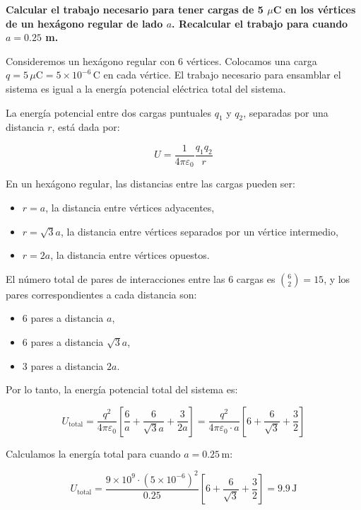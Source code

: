 \documentclass[answers]{exam} %
\begin{document}
\begin{questions}
	\vspace{0.5cm}

	\question \large\textbf{Calcular el trabajo necesario para tener cargas de 5 $\mu$C en los vértices de un hexágono regular de lado $a$. Recalcular el trabajo para cuando $a = 0.25$ m.}

	Consideremos un hexágono regular con 6 vértices. Colocamos una carga \( q = 5 \, \mu\text{C} = 5 \times 10^{-6} \, \text{C} \) en cada vértice. El trabajo necesario para ensamblar el sistema es igual a la energía potencial eléctrica total del sistema.

	La energía potencial entre dos cargas puntuales \( q_1 \) y \( q_2 \), separadas por una distancia \( r \), está dada por:

	\[
		U = \frac{1}{4 \pi \varepsilon_0} \frac{q_1 q_2}{r}
	\]

	En un hexágono regular, las distancias entre las cargas pueden ser:
	\begin{itemize}
		\item \( r = a \), la distancia entre vértices adyacentes,
		\item \( r = \sqrt{3}a \), la distancia entre vértices separados por un vértice intermedio,
		\item \( r = 2a \), la distancia entre vértices opuestos.
	\end{itemize}


	El número total de pares de interacciones entre las 6 cargas es \( \binom{6}{2} = 15 \), y los pares correspondientes a cada distancia son:
	\begin{itemize}
		\item 6 pares a distancia \( a \),
		\item 6 pares a distancia \( \sqrt{3}a \),
		\item 3 pares a distancia \( 2a \).
	\end{itemize}


	Por lo tanto, la energía potencial total del sistema es:

	\[
		U_{\text{total}} = \frac{q^2}{4 \pi \varepsilon_0} \left[ \frac{6}{a} + \frac{6}{\sqrt{3}a} +  \frac{3}{2a} \right] =\frac{q^2}{4 \pi \varepsilon_0 \cdot a} \left[6 + \frac{6}{\sqrt{3}} +  \frac{3}{2} \right]
	\]

	Calculamos la energía total para cuando \( a = 0.25 \, \text{m} \):

	\[
		U_{\text{total}} = \frac{9 \times 10^9 \cdot (5\times 10^{-6})^2}{0.25} \left[6 + \frac{6}{\sqrt{3}} +  \frac{3}{2} \right] = 9.9 \, \text{J}
	\]


\end{questions}
\end{document}
